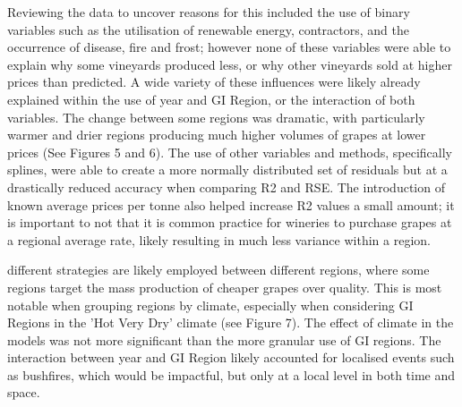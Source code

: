\documentclass[review,12pt,authoryear]{elsarticle}
\begin{document}
\begin{linenumbers}
%
Reviewing the data to uncover reasons for this included the use of binary variables such as the utilisation of renewable energy, contractors, and the occurrence of disease, fire and frost; however none of these variables were able to explain why some vineyards produced less, or why other vineyards sold at higher prices than predicted. A wide variety of these influences were likely already explained within the use of year and GI Region, or the interaction of both variables. The change between some regions was dramatic, with particularly warmer and drier regions producing much higher volumes of grapes at lower prices (See Figures 5 and 6). The use of other variables and methods, specifically splines, were able to create a more normally distributed set of residuals but at a drastically reduced accuracy when comparing R2 and RSE. The introduction of known average prices per tonne also helped increase R2 values a small amount; it is important to not that it is common practice for wineries to purchase grapes at a regional average rate, likely resulting in much less variance within a region.

different strategies are likely employed between different regions, where some regions target the mass production of cheaper grapes over quality. This is most notable when grouping regions by climate, especially when considering GI Regions in the 'Hot Very Dry' climate (see Figure 7). The effect of climate in the models was not more significant than the more granular use of GI regions. The interaction between year and GI Region likely accounted for localised events such as bushfires, which would be impactful, but only at a local level in both time and space.


\end{linenumbers}
\end{document}
